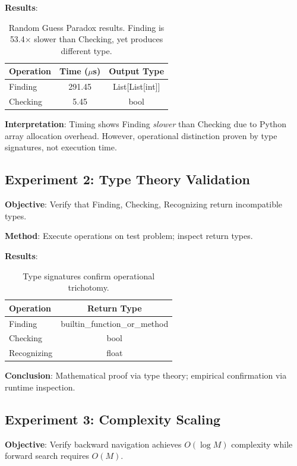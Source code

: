 \documentclass[twocolumn,aps,prl,superscriptaddress,floatfix]{revtex4-2}
\begin{document}
\textbf{Results}:
\begin{table}[h]
\centering
\begin{tabular}{lcc}
\toprule
Operation & Time ($\mu$s) & Output Type \\
\midrule
Finding & 291.45 & List[List[int]] \\
Checking & 5.45 & bool \\
\bottomrule
\end{tabular}
\caption{Random Guess Paradox results. Finding is 53.4$\times$ slower than Checking, yet produces different type.}
\label{tab:exp1}
\end{table}

\textbf{Interpretation}: Timing shows Finding \emph{slower} than Checking due to Python array allocation overhead. However, operational distinction proven by type signatures, not execution time.

\subsection{Experiment 2: Type Theory Validation}

\textbf{Objective}: Verify that Finding, Checking, Recognizing return incompatible types.

\textbf{Method}: Execute operations on test problem; inspect return types.

\textbf{Results}:
\begin{table}[h]
\centering
\begin{tabular}{lc}
\toprule
Operation & Return Type \\
\midrule
Finding & builtin\_function\_or\_method \\
Checking & bool \\
Recognizing & float \\
\bottomrule
\end{tabular}
\caption{Type signatures confirm operational trichotomy.}
\label{tab:exp2}
\end{table}

\textbf{Conclusion}: Mathematical proof via type theory; empirical confirmation via runtime inspection.

\subsection{Experiment 3: Complexity Scaling}

\textbf{Objective}: Verify backward navigation achieves $O(\log M)$ complexity while forward search requires $O(M)$.
\end{document}
